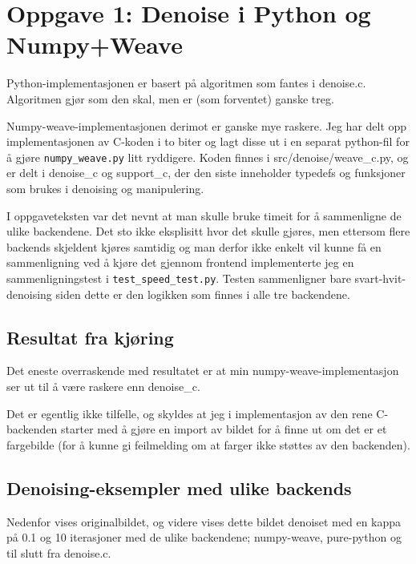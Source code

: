 \section*{Oppgave 1: Denoise i Python og Numpy+Weave}

Python-implementasjonen er basert på algoritmen som fantes i denoise.c. Algoritmen gjør som den skal, men er (som forventet) ganske treg.

Numpy-weave-implementasjonen derimot er ganske mye raskere. Jeg har delt opp implementasjonen av C-koden i to biter og lagt disse ut i en separat python-fil for å gjøre \verb;numpy_weave.py; litt ryddigere. Koden finnes i src/denoise/weave\_c.py, og er delt i denoise\_c og support\_c, der den siste inneholder typedefs og funksjoner som brukes i denoising og manipulering.

I oppgaveteksten var det nevnt at man skulle bruke timeit for å sammenligne de ulike backendene. Det sto ikke eksplisitt hvor det skulle gjøres, men ettersom flere backends skjeldent kjøres samtidig og man derfor ikke enkelt vil kunne få en sammenligning ved å kjøre det gjennom frontend implementerte jeg en sammenligningstest i \verb;test_speed_test.py;. Testen sammenligner bare svart-hvit-denoising siden dette er den logikken som finnes i alle tre backendene.

\subsection*{Resultat fra kjøring}

Det eneste overraskende med resultatet er at min numpy-weave-implementasjon ser ut til å være raskere enn denoise\_c.

Det er egentlig ikke tilfelle, og skyldes at jeg i implementasjon av den rene C-backenden starter med å gjøre en import av bildet for å finne ut om det er et fargebilde (for å kunne gi feilmelding om at farger ikke støttes av den backenden).

\subsection*{Denoising-eksempler med ulike backends}

Nedenfor vises originalbildet, og videre vises dette bildet denoiset med en kappa på 0.1 og 10 iterasjoner med de ulike backendene; numpy-weave, pure-python og til slutt fra denoise.c.

